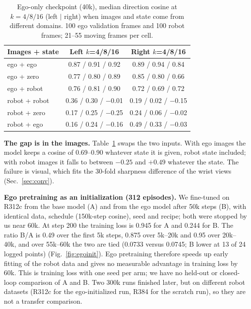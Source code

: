 \documentclass[conference,10pt]{IEEEtran}
\begin{document}
\begin{table}[t]
\centering\footnotesize\setlength{\tabcolsep}{3.2pt}
\caption{Ego-only checkpoint (40k), median direction cosine at $k{=}4/8/16$ (left $|$ right) when images and state come from
different domains. 100 ego validation frames and 100 robot frames; 21--55 moving frames per cell.}
\label{tab:ablation}
\begin{tabular}{@{}lcc@{}}
\toprule
Images + state & Left $k$=4/8/16 & Right $k$=4/8/16 \\
\midrule
ego + ego & 0.87 / 0.91 / 0.92 & 0.89 / 0.94 / 0.84 \\
ego + zero & 0.77 / 0.80 / 0.89 & 0.85 / 0.80 / 0.66 \\
ego + robot & 0.76 / 0.81 / 0.90 & 0.72 / 0.69 / 0.72 \\
robot + robot & 0.36 / 0.30 / $-$0.01 & 0.19 / 0.02 / $-$0.15 \\
robot + zero & 0.17 / 0.25 / $-$0.25 & 0.24 / 0.06 / $-$0.02 \\
robot + ego & 0.16 / 0.24 / $-$0.16 & 0.49 / 0.33 / $-$0.03 \\
\bottomrule
\end{tabular}
\end{table}

\textbf{The gap is in the images.} Table~\ref{tab:ablation} swaps the two inputs. With ego images the model keeps a cosine of
0.69--0.90 whatever state it is given, robot state included; with robot images it falls to between $-0.25$ and $+0.49$ whatever the
state. The failure is visual, which fits the 30-fold sharpness difference of the wrist views (Sec.~\ref{sec:conv}).

\textbf{Ego pretraining as an initialization (312 episodes).} We fine-tuned on R312c from the base model (A) and from the ego model
after 50k steps (B), with identical data, schedule (150k-step cosine), seed and recipe; both were stopped by us near 60k. At step 200
the training loss is 0.945 for A and 0.244 for B. The ratio B/A is 0.49 over the first 5k steps, 0.875 over 5k--20k and 0.95 over
20k--40k, and over 55k--60k the two are tied (0.0733 versus 0.0745; B lower at 13 of 24 logged points) (Fig.~\ref{fig:egoinit}).
Ego pretraining therefore speeds up early fitting of the robot data and gives no measurable advantage in training loss by 60k. This
is training loss with one seed per arm; we have no held-out or closed-loop comparison of A and B. Two 300k runs finished later, but
on different robot datasets (R312c for the ego-initialized run, R384 for the scratch run), so they are not a transfer comparison.
\end{document}
